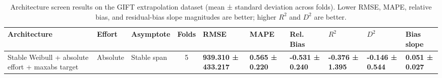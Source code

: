 \begin{table}
    \centering
    \small
    \setlength{\tabcolsep}{4pt}
    \begin{tabularx}{\textwidth}{l l l c >{\centering\arraybackslash}X >{\centering\arraybackslash}X >{\centering\arraybackslash}X >{\centering\arraybackslash}X >{\centering\arraybackslash}X >{\centering\arraybackslash}X}
    \toprule
    Architecture & Effort & Asymptote & Folds & RMSE & MAPE & Rel. Bias & $R^2$ & $D^2$ & Bias slope \\
    \midrule
    Stable Weibull + absolute effort + maxabs target & Absolute & Stable span & 5 & \textbf{939.310 ± 433.217} & \textbf{0.565 ± 0.220} & \textbf{-0.531 ± 0.240} & \textbf{-0.376 ± 1.395} & \textbf{-0.146 ± 0.544} & \textbf{0.051 ± 0.027} \\
    \bottomrule
    \end{tabularx}
    \caption{Architecture screen results on the GIFT extrapolation dataset (mean ± standard deviation across folds). Lower RMSE, MAPE, relative bias, and residual-bias slope magnitudes are better; higher $R^2$ and $D^2$ are better.}
    \label{tab:architecture_screen_extrap}
\end{table}
